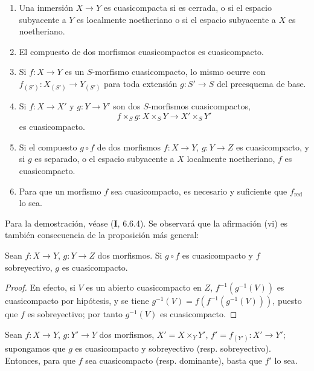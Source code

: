 \begin{proposition}[1.1.2]
\label{IV.1.1.2-fr}
\begin{enumerate}
  \item[\textup{(i)}] Una inmersión $X\to Y$ es cuasicompacta si es cerrada, o si
  el espacio subyacente a $Y$ es localmente noetheriano o si el espacio
  subyacente a $X$ es noetheriano.
  \item[\textup{(ii)}] El compuesto de dos morfismos cuasicompactos es cuasicompacto.
  \item[\textup{(iii)}] Si $f:X\to Y$ es un $S$-morfismo cuasicompacto, lo mismo ocurre con
  $f_{(S')}:X_{(S')}\to Y_{(S')}$ para toda extensión $g:S'\to S$ del
  preesquema de base.
  \item[\textup{(iv)}] Si $f:X\to X'$ y $g:Y\to Y'$ son dos $S$-morfismos
  cuasicompactos,
  \[
    f\times_S g:X\times_S Y\to X'\times_S Y'
  \]
  es cuasicompacto.
  \item[\textup{(v)}] Si el compuesto $g\circ f$ de dos morfismos $f:X\to Y$, $g:Y\to Z$
  es cuasicompacto, y si $g$ es separado, o el espacio subyacente a $X$
  localmente noetheriano, $f$ es cuasicompacto.
  \item[\textup{(vi)}] Para que un morfismo $f$ sea cuasicompacto, es necesario y suficiente que
  $f_{\mathrm{red}}$ lo sea.
\end{enumerate}
\end{proposition}

Para la demostración, véase (\textbf{I}, 6.6.4). Se observará que la afirmación (vi) es
también consecuencia de la proposición más general:

\begin{proposition}[1.1.3]
\label{IV.1.1.3-fr}
Sean $f:X\to Y$, $g:Y\to Z$ dos morfismos. Si $g\circ f$ es
cuasicompacto y $f$ sobreyectivo, $g$ es cuasicompacto.
\end{proposition}

\begin{proof}
En efecto, si $V$ es un abierto cuasicompacto en $Z$,
$f^{-1}(g^{-1}(V))$ es cuasicompacto por hipótesis, y se tiene
$g^{-1}(V)=f(f^{-1}(g^{-1}(V)))$, puesto que $f$ es sobreyectivo; por tanto
$g^{-1}(V)$ es cuasicompacto.
\end{proof}

\begin{corollary}[1.1.4]
\label{IV.1.1.4-fr}
Sean $f:X\to Y$, $g:Y'\to Y$ dos morfismos, $X'=X\times_Y Y'$,
$f'=f_{(Y')}:X'\to Y'$; supongamos que $g$ es cuasicompacto y sobreyectivo \textup{(resp.}
sobreyectivo\textup{)}. Entonces, para que $f$ sea cuasicompacto \textup{(resp.} dominante\textup{)}, basta
que $f'$ lo sea.
\end{corollary}

